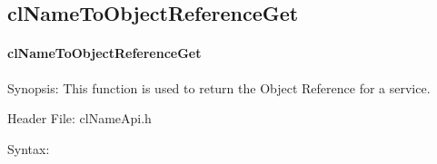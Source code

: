 \begin{flushleft}
\subsection{clNameToObjectReferenceGet}
\hypertarget{pagens108}{}\paragraph{cl\-Name\-To\-Object\-Reference\-Get}\label{pagens108}
\begin{Desc}
\item[Synopsis:]This function is used to return the Object Reference for a service.\end{Desc}
\begin{Desc}
\item[Header File:]clNameApi.h\end{Desc}
\begin{Desc}
\item[Syntax:]


\end{Desc}
\end{flushleft}
